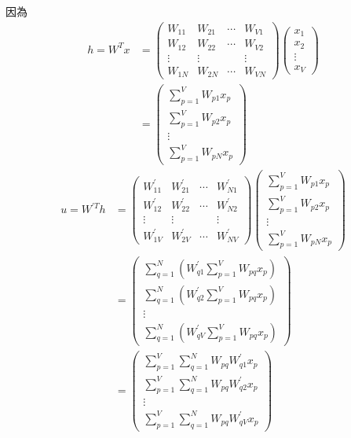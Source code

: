 \documentclass{article}
\begin{document}
\noindent
因為
\begin{align*}
    h = W^T x &= 
    \left(
    \begin{array}{cccc}
        W_{11} & W_{21} & \cdots & W_{V1}\\
        W_{12} & W_{22} & \cdots & W_{V2}\\
        \vdots & \vdots & & \vdots\\
        W_{1N} & W_{2N} & \cdots & W_{VN}
    \end{array}
    \right)
    \left(
    \begin{array}{c}
        x_1\\
        x_2\\
        \vdots\\
        x_V
    \end{array}
    \right)\\
    &= \left(
    \begin{array}{c}
        \sum_{p = 1}^V W_{p1} x_p\\
        \sum_{p = 1}^V W_{p2} x_p\\
        \vdots\\
        \sum_{p = 1}^V W_{pN} x_p
    \end{array}
    \right)
\end{align*}
\begin{align*}
    u = W^{\prime T} h &= 
    \left(
    \begin{array}{cccc}
        W^\prime_{11} & W^\prime_{21} & \cdots & W^\prime_{N1}\\
        W^\prime_{12} & W^\prime_{22} & \cdots & W^\prime_{N2}\\
        \vdots & \vdots & & \vdots\\ 
        W^\prime_{1V} & W^\prime_{2V} & \cdots & W^\prime_{NV}
    \end{array}
    \right)
    \left(
    \begin{array}{c}
        \sum_{p = 1}^V W_{p1} x_p\\
        \sum_{p = 1}^V W_{p2} x_p\\
        \vdots\\
        \sum_{p = 1}^V W_{pN} x_p
    \end{array}
    \right)\\
    &= \left(
    \begin{array}{c}
        \sum_{q = 1}^N (W^\prime_{q1} \sum_{p = 1}^V W_{pq} x_p)\\
        \sum_{q = 1}^N (W^\prime_{q2} \sum_{p = 1}^V W_{pq} x_p)\\
        \vdots\\
        \sum_{q = 1}^N (W^\prime_{qV} \sum_{p = 1}^V W_{pq} x_p)
    \end{array}
    \right)\\
    &= \left(
    \begin{array}{c}
        \sum_{p = 1}^V \sum_{q = 1}^N W_{pq} W^\prime_{q1} x_p\\
        \sum_{p = 1}^V \sum_{q = 1}^N W_{pq} W^\prime_{q2} x_p\\
        \vdots\\
        \sum_{p = 1}^V \sum_{q = 1}^N W_{pq} W^\prime_{qV} x_p
    \end{array}
    \right)
\end{align*}
\end{document}
